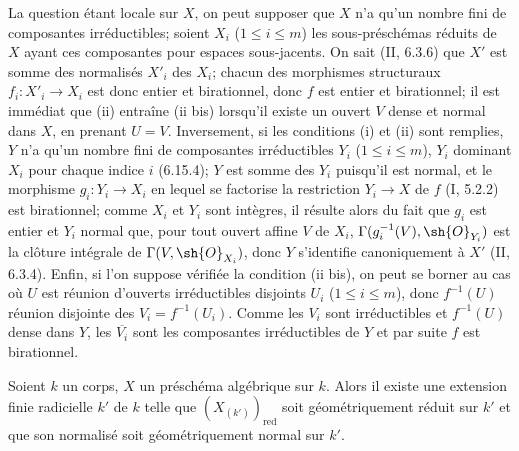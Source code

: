 La question étant locale sur $X$, on peut supposer que $X$ n'a qu'un nombre fini de composantes irréductibles; soient $X_i$ ($1\leq i\leq m$) les sous-préschémas réduits de $X$ ayant ces composantes pour espaces sous-jacents. On sait (II, 6.3.6) que $X'$ est somme des normalisés $X'_i$ des $X_i$; chacun des morphismes structuraux $f_i:X'_i\to X_i$ est donc entier et birationnel, donc $f$ est entier et birationnel; il est immédiat que (ii) entraîne (ii bis) lorsqu'il existe un ouvert $V$ dense et normal dans $X$, en prenant $U=V$. Inversement, si les conditions (i) et (ii) sont remplies, $Y$ n'a qu'un nombre fini de composantes irréductibles $Y_i$ ($1\leq i\leq m$), $Y_i$ dominant $X_i$ pour chaque indice $i$ (6.15.4); $Y$ est somme des $Y_i$ puisqu'il est normal, et le morphisme $g_i:Y_i\to X_i$ en lequel se factorise la restriction $Y_i\to X$ de $f$ (I, 5.2.2) est birationnel; comme $X_i$ et $Y_i$ sont intègres, il résulte alors du fait que $g_i$ est entier et $Y_i$ normal que, pour tout ouvert affine $V$ de $X_i$, $\Gamma(g_i^{-1}(V),\sh{O}_{Y_i})$ est la clôture intégrale de $\Gamma(V,\sh{O}_{X_i})$, donc $Y$ s'identifie canoniquement à $X'$ (II, 6.3.4). Enfin, si l'on suppose vérifiée la condition (ii bis), on peut se borner au cas où $U$ est réunion d'ouverts irréductibles disjoints $U_i$ ($1\leq i\leq m$), donc $f^{-1}(U)$ réunion disjointe des $V_i=f^{-1}(U_i)$. Comme les $V_i$ sont irréductibles et $f^{-1}(U)$ dense dans $Y$, les $\overline{V_i}$ sont les composantes irréductibles de $Y$ et par suite $f$ est birationnel.

\begin{lemma}[17.15.14.2]
\label{IV.17.15.14.2}
Soient $k$ un corps, $X$ un préschéma algébrique sur $k$. Alors il existe une extension finie radicielle $k'$ de $k$ telle que $(X_{(k')})_{\mathrm{red}}$ soit géométriquement réduit sur $k'$ et que son normalisé soit géométriquement normal sur $k'$.
\end{lemma}

